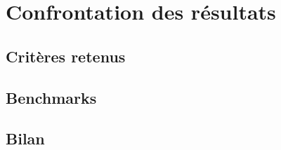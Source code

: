 \section{Confrontation des résultats}
\subsection{Critères retenus}
\subsection{Benchmarks}
\subsection{Bilan}

\pagebreak